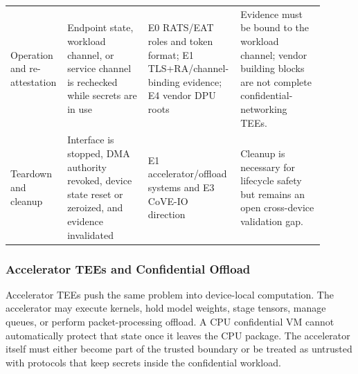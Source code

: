 \begin{table}[t]
\begin{tabular}{@{}p{0.15\linewidth}p{0.25\linewidth}p{0.24\linewidth}p{0.26\linewidth}@{}}
Operation and re-attestation & Endpoint state, workload channel, or service channel is rechecked while secrets are in use & E0 RATS/EAT roles and token format; E1 TLS+RA/channel-binding evidence; E4 vendor DPU roots~\cite{rats_rfc,eat_rfc,weinhold2025tlsra,nvidia_bluefield_operation_2025} & Evidence must be bound to the workload channel; vendor building blocks are not complete confidential-networking TEEs. \\
Teardown and cleanup & Interface is stopped, DMA authority revoked, device state reset or zeroized, and evidence invalidated & E1 accelerator/offload systems and E3 CoVE-IO direction~\cite{zhu2020hetee,dhar2024cloudscale,riscv_cove_io_2026} & Cleanup is necessary for lifecycle safety but remains an open cross-device validation gap. \\ \bottomrule
\end{tabular}
\end{table}

\subsubsection{Accelerator TEEs and Confidential Offload}

Accelerator TEEs push the same problem into device-local computation. The
accelerator may execute kernels, hold model weights, stage tensors, manage
queues, or perform packet-processing offload. A CPU confidential VM cannot
automatically protect that state once it leaves the CPU package. The accelerator
itself must either become part of the trusted boundary or be treated as
untrusted with protocols that keep secrets inside the confidential workload.


